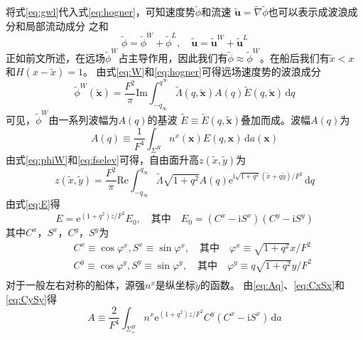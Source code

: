 将式\eqref{eq:gwl}代入式\eqref{eq:hogner}，可知速度势$\tilde{\phi}$和流速
$\tilde{\mathbf{u}}=\tilde{\nabla}\tilde{\phi}$也可以表示成波浪成分和局部流动成分
之和
\begin{equation}
  \tilde{\phi}=\tilde{\phi}^W+\tilde{\phi}^L,\quad 
  \tilde{\mathbf{u}}=\tilde{\mathbf{u}}^W+\tilde{\mathbf{u}}^L
  \label{eq:phiuwl}
\end{equation}
正如前文所述，在远场$\tilde{\phi}^W$占主导作用，因此我们有$\tilde{\phi}\approx\tilde{\phi}^W$。在船后我们有$\tilde{x}<x$和$H(x-\tilde{x})=1$。
由式\eqref{eq:W}和\eqref{eq:hogner}可得远场速度势的波浪成分
\begin{equation}
  \tilde{\phi}^W(\tilde{\mathbf{x}})=\frac{F^2}{\pi}\mathrm{Im}\int_{-q_{\infty}}^{q^{\infty}}\tilde{\Lambda}(q,\tilde{\mathbf{x}})A(q)\tilde{E}(q,\tilde{\mathbf{x}})
  \,\mathrm{d}q
  \label{eq:phiW}
\end{equation}
可见，$\tilde{\phi}^W$由一系列波幅为$A(q)$的基波
$\tilde{E}\equiv\tilde{E}(q,\tilde{\mathbf{x}})$叠加而成。波幅$A(q)$为
\begin{equation}
  A(q)\equiv\frac{1}{F^4}\int_{\Sigma^H}n^x(\mathbf{x})E(q,\mathbf{x})
  \,\mathrm{d}a(\mathbf{x})
  \label{eq:Aq}
\end{equation}
由式\eqref{eq:phiW}和\eqref{eq:fselev}可得，自由面升高$z(\tilde{x},\tilde{y})$为
\begin{equation}
  z(\tilde{x},\tilde{y})=\frac{F^2}{\pi}\mathrm{Re}\int_{-q_{\infty}}^{q_{\infty}}
  \tilde{\Lambda}\sqrt{1+q^2}A(q)\mathrm{e}^{\mathrm{i}\sqrt{1+q^2}(\tilde{x}+q\tilde{y})/F^2}\,\mathrm{d}q
  \label{eq:fsheight}
\end{equation}
由式\eqref{eq:E}得
\begin{equation}
  E=\mathrm{e}^{(1+q^2)z/F^2}E_0,\quad\text{其中}\quad 
  E_0=(C^x-\mathrm{i}S^x)(C^y-\mathrm{i}S^y)
  \label{eq:Esincos}
\end{equation}
其中$C^x$，$S^x$，$C^y$，$S^y$为
\begin{eqnarray}
  &&C^x\equiv\cos\varphi^x,S^x\equiv\sin\varphi^x,\quad\text{其中}\quad
  \varphi^x\equiv\sqrt{1+q^2}x/F^2 
  \label{eq:CxSx}\\
  &&C^y\equiv\cos\varphi^y,S^y\equiv\sin\varphi^y,\quad\text{其中}\quad
  \varphi^y\equiv q\sqrt{1+q^2}y/F^2 
  \label{eq:CySy}\\
\end{eqnarray}
对于一般左右对称的船体，源强$n^x$是纵坐标$\tilde{y}$的函数。
由\eqref{eq:Aq}、\eqref{eq:CxSx}和\eqref{eq:CySy}得
\begin{equation}
  A\equiv\frac{2}{F^4}\int_{\Sigma_+^H}n^x\mathrm{e}^{(1+q^2)z/F^2}C^y(C^x-\mathrm{i}S^x)\,\mathrm{d}a
  \label{eq:Asymmetry}
\end{equation}

